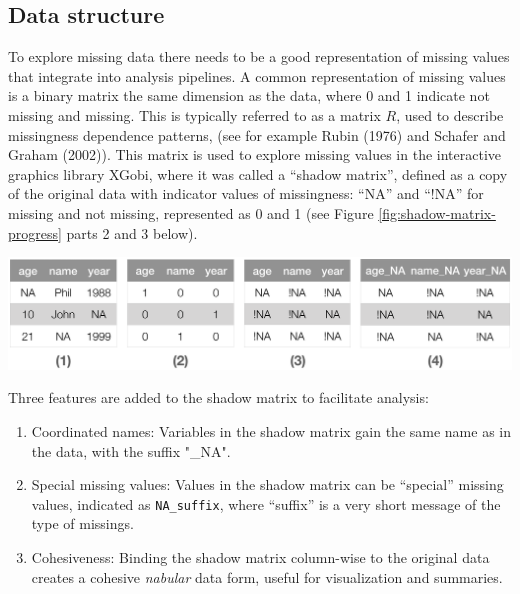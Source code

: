 \documentclass[]{article}
\let\origfigure\figure
\let\endorigfigure\endfigure
\renewenvironment{figure}[1][2] {
    \expandafter\origfigure\expandafter[H]
} {
    \endorigfigure
}
\theoremstyle{definition}
\theoremstyle{definition}
\theoremstyle{definition}
\theoremstyle{remark}
\begin{document}
\hypertarget{data-structure}{%
\subsection{Data structure}\label{data-structure}}

To explore missing data there needs to be a good representation of
missing values that integrate into analysis pipelines. A common
representation of missing values is a binary matrix the same dimension
as the data, where 0 and 1 indicate not missing and missing. This is
typically referred to as a matrix \(R\), used to describe missingness
dependence patterns, (see for example Rubin (1976) and Schafer and
Graham (2002)). This matrix is used to explore missing values in the
interactive graphics library XGobi, where it was called a ``shadow
matrix'', defined as a copy of the original data with indicator values
of missingness: ``NA'' and ``!NA'' for missing and not missing,
represented as 0 and 1 (see Figure \ref{fig:shadow-matrix-progress}
parts 2 and 3 below).

\begin{figure}

{\centering \includegraphics[width=1\linewidth]{full-conversion-to-shadow} 

}

\caption{Progression of creating shadow matrix data. (1-2) Data to a binary representation of missings, (2-3) Binary format converted to a shadow matrix (3-4) New and improved shadow matrix with changed variable names. This clearly links a variable to its state of missingness.}\label{fig:shadow-matrix-progress}
\end{figure}

Three features are added to the shadow matrix to facilitate analysis:

\begin{enumerate}
\def\labelenumi{\arabic{enumi}.}
\item
  Coordinated names: Variables in the shadow matrix gain the same name
  as in the data, with the suffix "\_NA".
\item
  Special missing values: Values in the shadow matrix can be ``special''
  missing values, indicated as \texttt{NA\_suffix}, where ``suffix'' is
  a very short message of the type of missings.
\item
  Cohesiveness: Binding the shadow matrix column-wise to the original
  data creates a cohesive \emph{nabular} data form, useful for
  visualization and summaries.
\end{enumerate}
\end{document}

